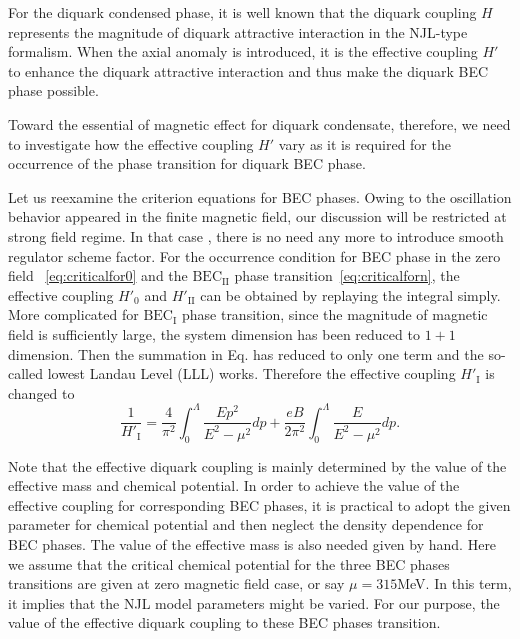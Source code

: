 \documentclass[prd, showpacs,nofootinbib,amsmath,amssymb]{revtex4}
\begin{document}

For the diquark  condensed phase, it is well known that  the diquark coupling $H$
represents the magnitude of diquark attractive interaction  in the NJL-type formalism.
When the axial anomaly is introduced, it is the effective coupling $H'$ to enhance the diquark attractive interaction and
thus make the diquark BEC phase possible.

Toward the essential of magnetic effect for diquark condensate, therefore, we need to investigate how the effective coupling $H'$ vary as  it is required for the occurrence of
the phase transition for diquark BEC phase.


Let us  reexamine the criterion equations for BEC phases.
Owing to the oscillation behavior appeared in the finite magnetic field, our discussion will be restricted at strong field regime. In that case , there is no need any more to introduce smooth regulator scheme factor.
For the occurrence condition for BEC  phase in the zero field ~\eqref{eq:criticalfor0} and the $\text{BEC}_\text{II}$ phase transition~\eqref{eq:criticalforn}, the effective coupling $H'_0$ and $H'_\text{II}$ can be obtained by replaying the integral simply.
More complicated  for $\text{BEC}_\text{I}$ phase transition,  since the magnitude of magnetic field is sufficiently large, the system dimension has been reduced to $1+1$ dimension. Then the summation in Eq. has reduced to only one term
and the so-called lowest Landau Level (LLL) works.
Therefore the effective coupling $H'_\text{I}$ is changed to
\begin{equation}\label{eq:cond2}
 \frac{1}{ H'_\text{I}}=\frac{4}{\pi^2} \int_0^\Lambda \frac{Ep^2 }{E^2 - \mu^2} dp+\frac{eB}{ 2\pi^2} \int_0^\Lambda
\frac{ E}{E^2 - \mu^2} dp.
\end{equation}



Note that the effective diquark coupling is mainly determined by the value of the effective mass and chemical potential.
In order to achieve the value of the effective coupling for corresponding BEC phases, it is practical to adopt the given parameter for chemical potential and then neglect the density dependence for BEC phases.
The value of the effective mass is also needed given by hand.
Here we assume that the critical chemical potential for the three BEC phases transitions are given  at  zero magnetic field case, or say $\mu=315$MeV.
In this term, it implies that the  NJL model parameters might be varied.
For our purpose, the value of the effective diquark coupling to these BEC phases transition.
\end{document}
